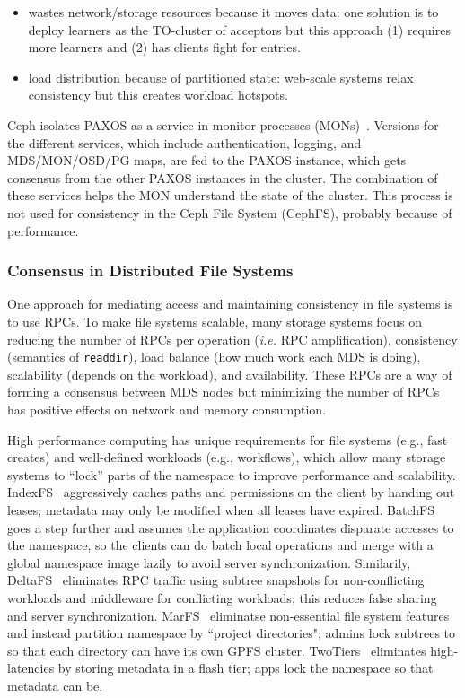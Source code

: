 \documentclass[conference]{acm_proc_article-sp} \usepackage[english]{babel}
\begin{document}
\begin{itemize}
	\item wastes network/storage resources because it moves data: one solution
    is to deploy learners as the TO-cluster of acceptors but this approach 
    (1) requires more learners and (2) has clients fight for entries.
    \item load distribution because of partitioned state: web-scale systems relax 
    consistency but this creates workload hotspots.  
\end{itemize}

Ceph isolates PAXOS as a service in monitor processes (MONs)~\cite{website:ceph-mon}. Versions for the different services, which include authentication, logging, and MDS/MON/OSD/PG maps, are fed to the PAXOS instance, which gets consensus from the other PAXOS instances in the cluster. The combination of these services helps the MON understand the state of the cluster. This process is not used for consistency in the Ceph File System (CephFS), probably because of performance.

\subsubsection{Consensus in Distributed File Systems}

One approach for mediating access and maintaining consistency in file systems
is to use RPCs. To make file systems scalable, many storage systems focus on
reducing the number of RPCs per operation ({\it i.e.} RPC amplification),
consistency (semantics of \texttt{readdir}), load balance (how much work each
MDS is doing), scalability (depends on the workload), and availability. These
RPCs are a way of forming a consensus between MDS nodes but minimizing the
number of RPCs has positive effects on network and memory consumption.

High performance computing has unique requirements for file systems ({e.g.}, fast creates) and well-defined workloads (e.g., workflows), which allow many storage systems to ``lock'' parts of the namespace to improve performance and scalability. IndexFS~\cite{} aggressively caches paths and permissions on the client by handing out leases; metadata may only be modified when all leases have expired. BatchFS~\cite{} goes a step further and assumes the application coordinates disparate accesses to the namespace, so the clients can do batch local operations and merge with a global namespace image lazily to avoid server synchronization. Similarily, DeltaFS~\cite{} eliminates RPC traffic using subtree snapshots for non-conflicting workloads and middleware for conflicting workloads; this reduces false sharing and server synchronization. MarFS~\cite{} eliminatse non-essential file system features and instead partition namespace by ``project directories"; admins lock subtrees to so that each directory can have its own GPFS cluster. TwoTiers~\cite{} eliminates high-latencies by storing metadata in a flash tier; apps lock the namespace so that metadata can be. 
\end{document}
